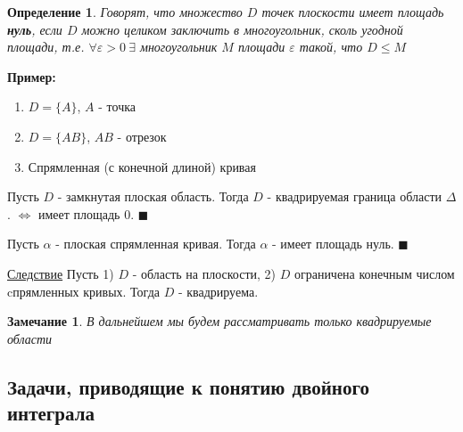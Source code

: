 \documentclass[a4paper, 14pt]{report}
\newtheorem{defenition}{Определение}[section]
\newtheorem{note}{Замечание}[section]
\begin{document}
\hfill

\begin{defenition}
    Говорят, что множество $D$ точек плоскости имеет площадь \textbf{нуль}, если $D$ можно целиком заключить в многоугольник, сколь угодной площади, т.е. $\forall \varepsilon > 0\ \exists$ многоугольник $M$ площади $\varepsilon$ такой, что $D \le M$
\end{defenition}

\hfill

\textbf{Пример:}
\begin{enumerate}
    \item[1)] $D = \{ A \}$, $A$ - точка
    \item[2)] $D = \{ AB \}$, $AB$ - отрезок
    \item[3)] Спрямленная (с конечной длиной) кривая
\end{enumerate}

\begin{theorem}
    Пусть $D$ - замкнутая плоская область. Тогда $D$ - квадрируемая граница области $\Delta$. $\Leftrightarrow$ имеет площадь 0. $\blacksquare$
\end{theorem}

\hfill

\begin{theorem}
    Пусть $\alpha$ - плоская спрямленная кривая. Тогда $\alpha$ - имеет площадь нуль. $\blacksquare$
\end{theorem}

\hfill

\underline{Следствие} Пусть 1) $D$ - область на плоскости, 2) $D$ ограничена конечным числом cпрямленных кривых. Тогда $D$ - квадрируема.

\hfill

\begin{note}
    В дальнейшем мы будем рассматривать только квадрируемые области
\end{note}

\subsection{Задачи, приводящие к понятию двойного интеграла}
\end{document}
